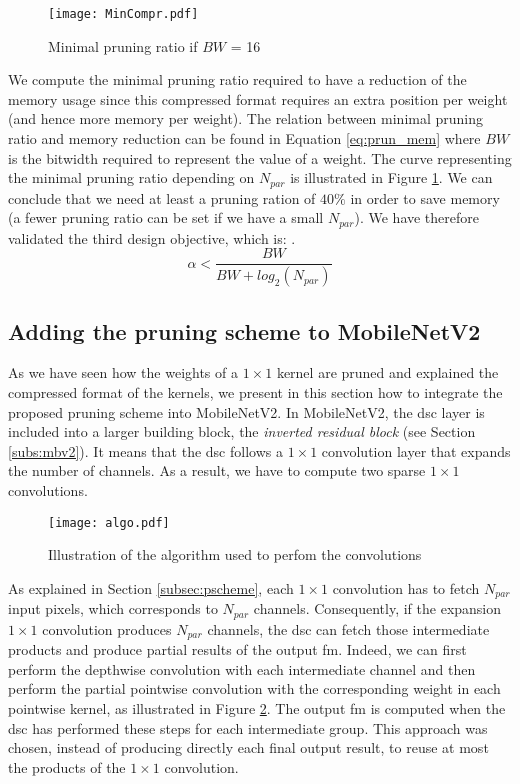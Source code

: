 \begin{figure}
    \centering
    \texttt{[image: MinCompr.pdf]}
    \caption{Minimal pruning ratio if $BW$ = 16}
    \label{fig:prun_mem}
\end{figure}
%
We compute the minimal pruning ratio required to have a reduction of the memory usage since this compressed format requires an extra position per weight (and hence more memory per weight). The relation between minimal pruning ratio and memory reduction can be found in Equation \eqref{eq:prun_mem} where $BW$ is the bitwidth required to represent the value of a weight. The curve representing the minimal pruning ratio depending on $N_{par}$ is illustrated in Figure \ref{fig:prun_mem}. We can conclude that we need at least a pruning ration of $40\%$ in order to save memory (a fewer pruning ratio can be set if we have a small $N_{par}$). We have therefore validated the third design objective, which is: \textbf{}.
%
\begin{equation}
    \alpha < \frac{BW}{ BW + log_2(N_{par})}
    \label{eq:prun_mem}
\end{equation}
%
\subsection{Adding the pruning scheme to MobileNetV2} \label{subsec:mbnv2-pr}
%
As we have seen how the weights of a $1 \times 1$ kernel are pruned and explained the compressed format of the kernels, we present in this section how to integrate the proposed pruning scheme into MobileNetV2. In MobileNetV2, the \acrshort{dsc} layer is included into a larger building block, the \textit{inverted residual block} (see Section \ref{subs:mbv2}). It means that the \acrshort{dsc} follows a $1 \times 1$ convolution layer that expands the number of channels. As a result, we have to compute two sparse $1 \times 1$ convolutions.

%
\begin{figure}
    \centering
    \texttt{[image: algo.pdf]}
    \caption{Illustration of the algorithm used to perfom the convolutions}
    \label{fig:algo}
\end{figure}
%
As explained in Section \ref{subsec:pscheme}, each $1 \times 1$ convolution has to fetch $N_{par}$ input pixels, which corresponds to $N_{par}$ channels. Consequently, if the expansion $1 \times 1$ convolution produces $N_{par}$ channels, the \acrshort{dsc} can fetch those intermediate products and produce partial results of the output \acrshort{fm}. Indeed, we can first perform the depthwise convolution with each intermediate channel and then perform the partial pointwise convolution with the corresponding weight in each pointwise kernel, as illustrated in Figure \ref{fig:algo}.
The output \acrshort{fm} is computed when the \acrshort{dsc} has performed these steps for each intermediate group. This approach was chosen, instead of producing directly each final output result, to reuse at most the products of the $1 \times 1$ convolution.

